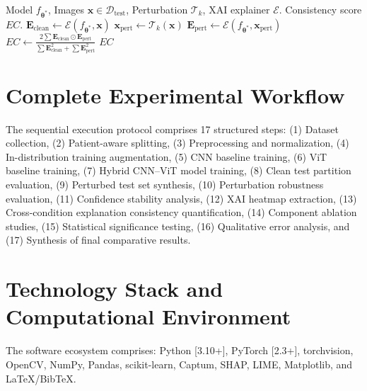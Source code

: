 \documentclass[conference]{IEEEtran}
\begin{document}
\begin{algorithm}[H]
\caption{Explanation Consistency Analysis}
\label{alg:explanation_consistency}
\begin{algorithmic}[1]
\REQUIRE Model $f_{\boldsymbol{\theta}^*}$, Images $\mathbf{x} \in \mathcal{D}_{\text{test}}$, Perturbation $\mathcal{T}_k$, XAI explainer $\mathcal{E}$.
\ENSURE Consistency score $EC$.
\STATE $\mathbf{E}_{\text{clean}} \leftarrow \mathcal{E}(f_{\boldsymbol{\theta}^*}, \mathbf{x})$ 
\STATE $\mathbf{x}_{\text{pert}} \leftarrow \mathcal{T}_k(\mathbf{x})$
\STATE $\mathbf{E}_{\text{pert}} \leftarrow \mathcal{E}(f_{\boldsymbol{\theta}^*}, \mathbf{x}_{\text{pert}})$ 
\STATE $EC \leftarrow \frac{2 \sum \mathbf{E}_{\text{clean}} \odot \mathbf{E}_{\text{pert}}}{\sum \mathbf{E}_{\text{clean}}^2 + \sum \mathbf{E}_{\text{pert}}^2}$ 
\RETURN $EC$
\end{algorithmic}
\end{algorithm}

\section{Complete Experimental Workflow}
\label{sec:workflow}

The sequential execution protocol comprises 17 structured steps:
(1) Dataset collection, (2) Patient-aware splitting, (3) Preprocessing and normalization, (4) In-distribution training augmentation, (5) CNN baseline training, (6) ViT baseline training, (7) Hybrid CNN--ViT model training, (8) Clean test partition evaluation, (9) Perturbed test set synthesis, (10) Perturbation robustness evaluation, (11) Confidence stability analysis, (12) XAI heatmap extraction, (13) Cross-condition explanation consistency quantification, (14) Component ablation studies, (15) Statistical significance testing, (16) Qualitative error analysis, and (17) Synthesis of final comparative results.

\section{Technology Stack and Computational Environment}
\label{sec:tech_stack}

The software ecosystem comprises: Python [3.10+], PyTorch [2.3+], torchvision, OpenCV, NumPy, Pandas, scikit-learn, Captum, SHAP, LIME, Matplotlib, and LaTeX/BibTeX.
\end{document}
